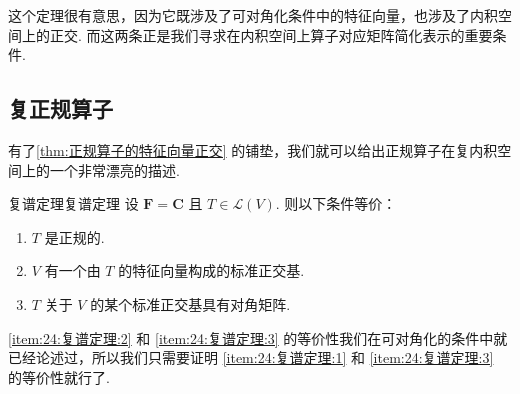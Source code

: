 这个定理很有意思，因为它既涉及了可对角化条件中的特征向量，也涉及了内积空间上的正交. 而这两条正是我们寻求在内积空间上算子对应矩阵简化表示的重要条件.

\subsection{复正规算子}

有了\autoref{thm:正规算子的特征向量正交} 的铺垫，我们就可以给出正规算子在复内积空间上的一个非常漂亮的描述.

\begin{theorem}{复谱定理}{复谱定理} 
    设 $ \mathbf{F} = \mathbf{C} $ 且 $ T \in \mathcal{L}(V) $. 则以下条件等价：
    \begin{enumerate}
        \item \label{item:24:复谱定理:1}
              $ T $ 是正规的.

        \item \label{item:24:复谱定理:2}
              $ V $ 有一个由 $ T $ 的特征向量构成的标准正交基.

        \item \label{item:24:复谱定理:3}
              $ T $ 关于 $ V $ 的某个标准正交基具有对角矩阵.
    \end{enumerate}
\end{theorem}

\ref*{item:24:复谱定理:2} 和 \ref*{item:24:复谱定理:3} 的等价性我们在可对角化的条件中就已经论述过，所以我们只需要证明 \ref*{item:24:复谱定理:1} 和 \ref*{item:24:复谱定理:3} 的等价性就行了.

